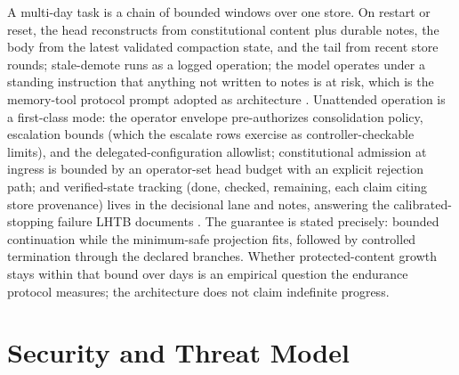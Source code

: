 \documentclass[11pt]{article}
\begin{document}
A multi-day task is a chain of bounded windows over one store. On restart or reset, the head reconstructs from constitutional content plus durable notes, the body from the latest validated compaction state, and the tail from recent store rounds; stale-demote runs as a logged operation; the model operates under a standing instruction that anything not written to notes is at risk, which is the memory-tool protocol prompt adopted as architecture \cite{anthropic2026cookbook}. Unattended operation is a first-class mode: the operator envelope pre-authorizes consolidation policy, escalation bounds (which the escalate rows exercise as controller-checkable limits), and the delegated-configuration allowlist; constitutional admission at ingress is bounded by an operator-set head budget with an explicit rejection path; and verified-state tracking (done, checked, remaining, each claim citing store provenance) lives in the decisional lane and notes, answering the calibrated-stopping failure LHTB documents \cite{lhtb2026}. The guarantee is stated precisely: bounded continuation while the minimum-safe projection fits, followed by controlled termination through the declared branches. Whether protected-content growth stays within that bound over days is an empirical question the endurance protocol measures; the architecture does not claim indefinite progress.

\section{Security and Threat Model}
\label{sec:threat}
\end{document}
